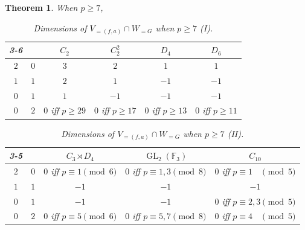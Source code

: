 \documentclass{amsart}
\newcommand{\GL}{\operatorname{GL}}
\numberwithin{equation}{section}
\newtheorem{theorem}{Theorem}[section]  %
\theoremstyle{definition}
\theoremstyle{remark}
\begin{document}
\begin{theorem}
When $p\geq 7$,\\
\begin{table}[H]
\centering
\begin{tabular}{cc|c|c|c|c|}
\cline{3-6}
                                                &                           & \cellcolor[HTML]{a7c957}$C_2$ & \cellcolor[HTML]{a7c957}$C_2^2$ & \cellcolor[HTML]{a7c957}$D_4$ & \cellcolor[HTML]{a7c957}$D_6$ \\ \hline
\multicolumn{1}{|c|}{\cellcolor[HTML]{a7c957}$2$} & \cellcolor[HTML]{a7c957}$0$ & $3$ & $2$ & $1$ & $1$ \\ \hline
\multicolumn{1}{|c|}{\cellcolor[HTML]{a7c957}$1$} & \cellcolor[HTML]{a7c957}$1$ & $2$ & $1$ & {\color[HTML]{C0C0C0} $-1$} & {\color[HTML]{C0C0C0} $-1$} \\ \hline
\multicolumn{1}{|c|}{\cellcolor[HTML]{a7c957}$0$} & \cellcolor[HTML]{a7c957}$1$ & $1$ & {\color[HTML]{C0C0C0} $-1$} & {\color[HTML]{C0C0C0} $-1$} & {\color[HTML]{C0C0C0} $-1$} \\ \hline
\multicolumn{1}{|c|}{\cellcolor[HTML]{a7c957}$0$} & \cellcolor[HTML]{a7c957}$2$ & $0$ iff $p\geq29$ & $0$ iff $p\geq17$ & $0$ iff $p\geq13$ & $0$ iff $p\geq11$ \\ \hline
\end{tabular}
\caption{Dimensions of $V_{=(f,a)}\cap W_{= G}$ when $p\geq7$ (I).}

\end{table}

\begin{table}[H]
\centering
\begin{tabular}{cc|c|c|c|}
\cline{3-5}
                                                &                           & \cellcolor[HTML]{a7c957}$C_3\rtimes D_4$ & \cellcolor[HTML]{a7c957}$\GL_2(\mathbb{F}_3)$ & \cellcolor[HTML]{a7c957}$C_{10}$ \\ \hline
\multicolumn{1}{|c|}{\cellcolor[HTML]{a7c957}$2$} & \cellcolor[HTML]{a7c957}$0$ & $0$ iff $p\equiv 1\pmod 6$ & $0$ iff $p\equiv1,3 \pmod 8$ & $0$ iff $p\equiv1\phantom{,2} \pmod 5$ \\ \hline
\multicolumn{1}{|c|}{\cellcolor[HTML]{a7c957}$1$} & \cellcolor[HTML]{a7c957}$1$ & {\color[HTML]{C0C0C0} $-1$} & {\color[HTML]{C0C0C0} $-1$} & {\color[HTML]{C0C0C0} $-1$} \\ \hline
\multicolumn{1}{|c|}{\cellcolor[HTML]{a7c957}$0$} & \cellcolor[HTML]{a7c957}$1$ & {\color[HTML]{C0C0C0} $-1$} & {\color[HTML]{C0C0C0} $-1$} & $0$ iff $p\equiv2,3 \pmod 5$ \\ \hline
\multicolumn{1}{|c|}{\cellcolor[HTML]{a7c957}$0$} & \cellcolor[HTML]{a7c957}$2$ & $0$ iff $p\equiv 5 \pmod 6$ & $0$ iff $ p\equiv 5,7 \pmod 8$ & $0$ iff $p\equiv 4\phantom{,2} \pmod 5$ \\ \hline
\end{tabular}
\caption{Dimensions of $V_{=(f,a)}\cap W_{= G}$ when $p\geq7$ (II).}
\end{table} 
\end{theorem}
\end{document}
